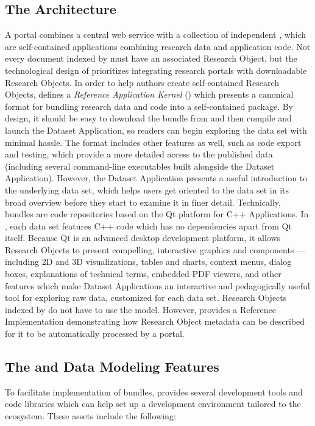 \documentclass[11pt,letterpaper]{article}
\begin{document}
\subsection{The {\lMOSAIC} Architecture}
A {\MOSAIC} portal combines a central web service with a 
collection of independent , 
which are self-contained applications combining 
research data and application code.  Not every 
document indexed by {\MOSAIC} must have an associated 
Research Object, but the technological design of 
{\MOSAIC} prioritizes integrating research portals 
with downloadable Research Objects.
\p{}
In order to help authors create self-contained 
Research Objects, {\MOSAIC} defines a 
\textit{Reference Application Kernel} ({\RAK}) 
which presents a canonical format for bundling 
research data and code into a self-contained 
package.   By design, it should be easy 
to download the {\RAK} bundle from {\MOSAIC} and 
then compile and launch the Dataset Application, so 
readers can begin exploring the data set with 
minimal hassle.  
\p{}
The {\RAK} format includes other 
features as well, such as code export and testing, 
which provide a more detailed access to 
the published data (including several command-line 
executables built alongside the Dataset Application).  
However, the Dataset Application 
presents a useful introduction to the underlying 
data set, which helps users get oriented to the data set 
in its broad overview before they start to examine it in 
finer detail.
\p{}
Technically, {\MOSAIC} {\RAK} bundles are code repositories 
based on the Qt platform for C++ Applications.  
In {\RAK}, each data set features C++ code which has no 
dependencies apart from Qt itself.  Because Qt is an advanced 
desktop {\GUI} development platform, it allows 
Research Objects to present compelling, 
interactive graphics and {\GUI} components 
--- including 2D and 3D visualizations, tables and charts, 
context menus, dialog boxes, explanations of 
technical terms, embedded PDF viewers, and other 
features which make Dataset Applications an 
interactive and pedagogically useful tool for 
exploring raw data, customized for each data set.
\p{}  
Research Objects indexed by {\MOSAIC} do not have to 
use the {\RAK} model.  However, {\RAK} provides a 
Reference Implementation demonstrating how Research Object 
metadata can be described for it to be automatically 
processed by a {\MOSAIC} portal.

\subsection{The {\lMOSAIC} {\lSDK} and Data Modeling Features}
To facilitate implementation of {\RAK} bundles, 
{\MOSAIC} provides several development tools and 
code libraries which can help set up a development 
environment tailored to the {\MOSAIC} ecosystem.  
These assets include the following: 
\end{document}
